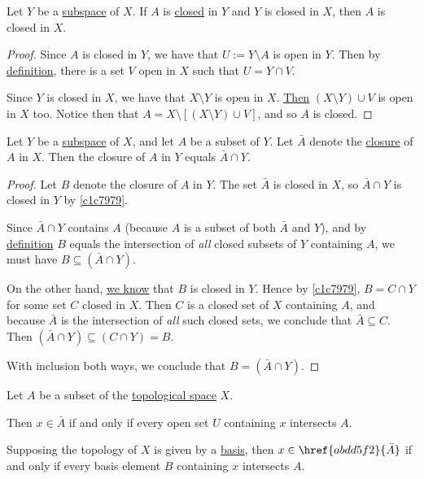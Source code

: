 \label{f493ac5}

Let $Y$ be a \href{cddfbd8}{subspace} of $X$. If $A$ is \href{dd23fec}{closed}
in $Y$ and $Y$ is closed in $X$, then $A$ is closed in $X$.

\begin{proof}
  Since $A$ is closed in $Y$, we have that $U:=Y\setminus A$ is open in $Y$.
  Then by \href{cddfbd8}{definition}, there is a set $V$ open in $X$ such that
  $U=Y\cap V$.

  Since $Y$ is closed in $X$, we have that $X\setminus Y$ is open in $X$.
  \href{cc8eb8b}{Then} $(X\setminus Y)\cup V$ is open in $X$ too. Notice then
  that $A=X\setminus[(X\setminus Y)\cup V]$, and so $A$ is closed.
\end{proof}

\label{cbef537}

Let $Y$ be a \href{cddfbd8}{subspace} of $X$, and let $A$ be a subset of $Y$.
Let $\bar A$ denote the \href{abdd5f2}{closure} of $A$ in $X$. Then the closure
of $A$ in $Y$ equals $\bar A\cap Y$.

\begin{proof}
  Let $B$ denote the closure of $A$ in $Y$. The set $\bar A$ is closed in $X$,
  so $\bar A\cap Y$ is closed in $Y$ by \autoref{c1c7979}.

  Since $\bar A\cap Y$ contains $A$ (because $A$ is a subset of both $\bar A$
  and $Y$), and by \href{abdd5f2}{definition} $B$ equals the intersection of
  \textit{all} closed subsets of $Y$ containing $A$, we must have
  $B\subseteq(\bar A\cap Y)$.

  On the other hand, \href{abdd5f2}{we know} that $B$ is closed in $Y$. Hence
  by \autoref{c1c7979}, $B=C\cap Y$ for some set $C$ closed in $X$. Then $C$ is
  a closed set of $X$ containing $A$, and because $\bar A$ is the intersection
  of \textit{all} such closed sets, we conclude that $\bar A\subseteq C$. Then
  $(\bar A\cap Y)\subseteq(C\cap Y)=B$.

  With inclusion both ways, we conclude that $B=(\bar A\cap Y)$.
\end{proof}

\label{c68b271}

Let $A$ be a subset of the \href{de3c1b1}{topological space} $X$.
\begin{enumerata}
  \item Then $x\in\bar A$ if and only if every open set $U$ containing $x$
        intersects $A$.
  \item Supposing the topology of $X$ is given by a \href{e896402}{basis}, then
        $x\in\href{abdd5f2}{\bar A}$ if and only if every basis element $B$
        containing $x$ intersects $A$.
\end{enumerata}

